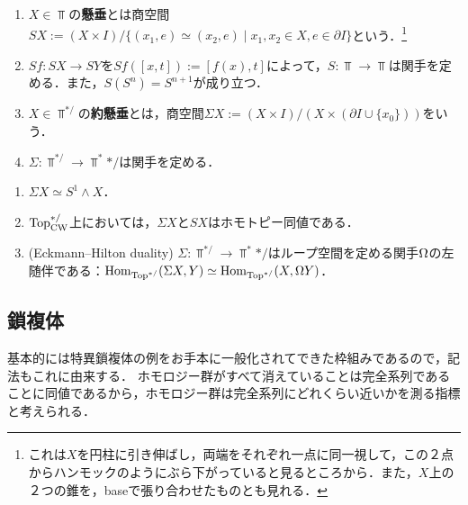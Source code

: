 \documentclass[uplatex,dvipdfmx]{jsreport}
\begin{document}
\begin{definition}\mbox{}\label{def-suspension}
    \begin{enumerate}
        \item $X\in\Top$の\textbf{懸垂}とは商空間$SX:=(X\times I)/\{(x_1,e)\simeq(x_2,e)\mid x_1,x_2\in X,e\in\partial I\}$という．\footnote{これは$X$を円柱に引き伸ばし，両端をそれぞれ一点に同一視して，この２点からハンモックのようにぶら下がっていると見るところから．また，$X$上の２つの錐を，baseで張り合わせたものとも見れる．}
        \item $Sf:SX\to SY$を$Sf([x,t]):=[f(x),t]$によって，$S:\Top\to\Top$は関手を定める．また，$S(S^n)=S^{n+1}$が成り立つ．
        \item $X\in\Top^{*/}$の\textbf{約懸垂}とは，商空間$\Sigma X:=(X\times I)/(X\times(\partial I\cup\{x_0\}))$をいう．
        \item $\Sigma:\Top^{*/}\to\Top^*{*/}$は関手を定める．
    \end{enumerate}
\end{definition}

\begin{lemma}[約懸垂の表示]\mbox{}
    \begin{enumerate}
        \item $\Sigma X\simeq S^1\wedge X$．
        \item $\mathrm{Top}_{\mathrm{CW}}^{*/}$上においては，$\Sigma X$と$SX$はホモトピー同値である．
        \item (Eckmann–Hilton duality) $\Sigma:\Top^{*/}\to\Top^*{*/}$はループ空間を定める関手$\Omega$の左随伴である：$\mathrm{Hom}_{\mathrm{Top}^{*/}}(\Sigma X,Y)\simeq\mathrm{Hom}_{\mathrm{Top}^{*/}}(X,\Omega Y)$．
    \end{enumerate}
\end{lemma}

\subsection{鎖複体}

\begin{tcolorbox}[colframe=ForestGreen, colback=ForestGreen!10!white,breakable,colbacktitle=ForestGreen!40!white,coltitle=black,fonttitle=\bfseries\sffamily,
title=]
    基本的には特異鎖複体の例をお手本に一般化されてできた枠組みであるので，記法もこれに由来する．
    ホモロジー群がすべて消えていることは完全系列であることに同値であるから，ホモロジー群は完全系列にどれくらい近いかを測る指標と考えられる．
\end{tcolorbox}
\end{document}
